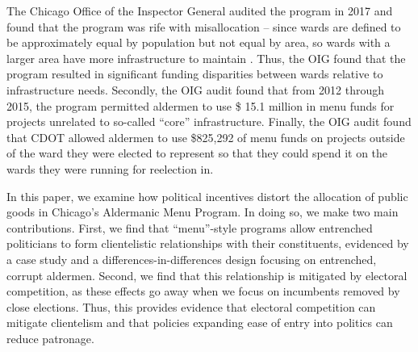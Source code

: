 The Chicago Office of the Inspector General audited the program in 2017 and found that the program was rife with misallocation -- since wards are defined to be approximately equal by population but not equal by area, so wards with a larger area have more infrastructure to maintain \cite{OIGaudit}.
Thus, the OIG found that the program resulted in significant funding disparities between wards relative to infrastructure needs.
Secondly, the OIG audit found that from 2012 through 2015, the program permitted aldermen to use \$ 15.1 million in menu funds for projects unrelated to so-called ``core'' infrastructure.
Finally, the OIG audit found that CDOT allowed aldermen to use \$825,292 of menu funds on projects outside of the ward they were elected to represent so that they could spend it on the wards they were running for reelection in.

In this paper, we examine how political incentives distort the allocation of public goods in Chicago's Aldermanic Menu Program.
In doing so, we make two main contributions.
First, we find that ``menu''-style programs allow entrenched politicians to form clientelistic relationships with their constituents, evidenced by a case study and a differences-in-differences design focusing on entrenched, corrupt aldermen.
Second, we find that this relationship is mitigated by electoral competition, as these effects go away when we focus on incumbents removed by close elections. 
Thus, this provides evidence that electoral competition can mitigate clientelism and that policies expanding ease of entry into politics can reduce patronage.

